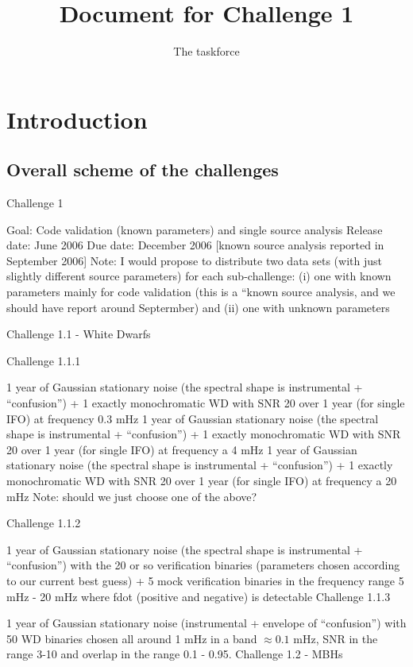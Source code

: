 \documentclass[11pt]{report}
\begin{document}
\title{\bf Document for Challenge 1}

\author{The taskforce}

\maketitle

\chapter{Introduction}

\section{Overall scheme of the challenges}

Challenge 1

Goal: Code validation (known parameters) and single source analysis 
Release date: June 2006 
Due date: December 2006 [known source analysis reported in September 2006] 
Note: I would propose to distribute two data sets (with just slightly different source parameters) for each sub-challenge: (i) one with known parameters mainly for code validation (this is a “known source analysis, and we should have report around Septermber) and (ii) one with unknown parameters

Challenge 1.1 - White Dwarfs

Challenge 1.1.1

1 year of Gaussian stationary noise (the spectral shape is instrumental + “confusion”) + 1 exactly monochromatic WD with SNR 20 over 1 year (for single IFO) at frequency 0.3 mHz 
1 year of Gaussian stationary noise (the spectral shape is instrumental + “confusion”) + 1 exactly monochromatic WD with SNR 20 over 1 year (for single IFO) at frequency a 4 mHz 
1 year of Gaussian stationary noise (the spectral shape is instrumental + “confusion”) + 1 exactly monochromatic WD with SNR 20 over 1 year (for single IFO) at frequency a 20 mHz 
Note: should we just choose one of the above?

Challenge 1.1.2

1 year of Gaussian stationary noise (the spectral shape is instrumental + “confusion”) with the 20 or so verification binaries (parameters chosen according to our current best guess) + 5 mock verification binaries in the frequency range 5 mHz - 20 mHz where fdot (positive and negative) is detectable
Challenge 1.1.3

1 year of Gaussian stationary noise (instrumental + envelope of “confusion”) with 50 WD binaries chosen all around 1 mHz in a band $\approx 0.1$ mHz, SNR in the range 3-10 and overlap in the range 0.1 - 0.95.
Challenge 1.2 - MBHs
\end{document}
